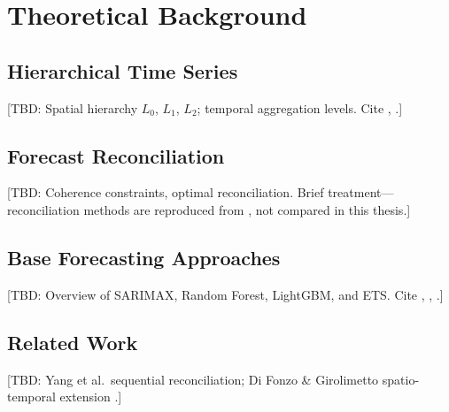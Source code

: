 \section{Theoretical Background}\label{sec:background}

\subsection{Hierarchical Time Series}\label{sec:hierarchical-ts}

[TBD: Spatial hierarchy $L_0$, $L_1$, $L_2$; temporal aggregation levels. Cite \citet{hyndman2021fpp}, \citet{wickramasuriya2019optimal}.]

\subsection{Forecast Reconciliation}\label{sec:reconciliation-theory}

[TBD: Coherence constraints, optimal reconciliation. Brief treatment---reconciliation methods are reproduced from \citet{difonzo2023spatiotemporal}, not compared in this thesis.]

\subsection{Base Forecasting Approaches}\label{sec:base-theory}

[TBD: Overview of SARIMAX, Random Forest, LightGBM, and ETS. Cite \citet{breiman2001random}, \citet{ke2017lightgbm}, \citet{hyndman2011thief}.]

\subsection{Related Work}\label{sec:related-work}

[TBD: Yang et al.\ sequential reconciliation; Di Fonzo \& Girolimetto spatio-temporal extension \citep{difonzo2023spatiotemporal}.]
